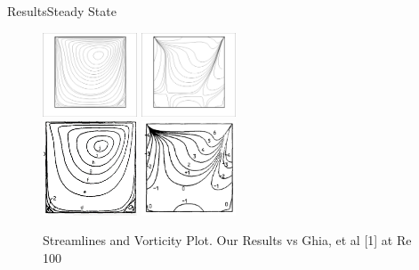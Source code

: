 \documentclass[11pt]{beamer}
\begin{document}
\begin{frame}{Results}{Steady State}
\begin{figure}[hH]
\includegraphics[width=0.25\textwidth]{images/steady/100psi}
\includegraphics[width=0.25\textwidth]{images/steady/100omega}\\
\includegraphics[width=0.25\textwidth]{images/steady/ghia100psi}
\includegraphics[width=0.25\textwidth]{images/steady/ghia100omega}
\caption{Streamlines and Vorticity Plot. Our Results vs Ghia, et al [1] at Re 100}
\end{figure}
\end{frame}
\end{document}
